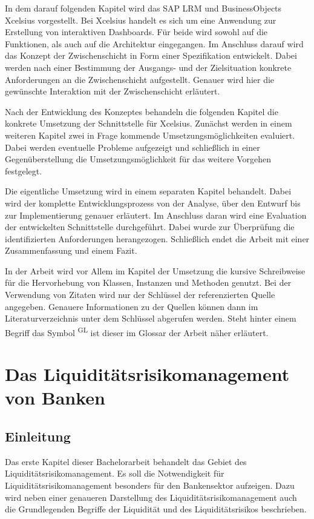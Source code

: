 \begin{onehalfspacing}
In dem darauf folgenden Kapitel wird das SAP LRM und BusinessObjects Xcelsius vorgestellt. Bei Xcelsius handelt es sich um eine Anwendung zur Erstellung von interaktiven Dashboards. Für beide wird sowohl auf die Funktionen, als auch auf die Architektur eingegangen.
Im Anschluss darauf wird das Konzept der Zwischenschicht in Form einer Spezifikation entwickelt. Dabei werden nach einer Bestimmung der Ausgangs- und der Zielsituation konkrete Anforderungen an die Zwischenschicht aufgestellt. Genauer wird hier die gewünschte Interaktion mit der Zwischenschicht erläutert.

Nach der Entwicklung des Konzeptes behandeln die folgenden Kapitel die konkrete Umsetzung der Schnittstelle für Xcelsius. Zunächst werden in einem weiteren Kapitel zwei in Frage kommende Umsetzungsmöglichkeiten evaluiert. Dabei werden eventuelle Probleme aufgezeigt und schließlich in einer Gegenüberstellung die Umsetzungsmöglichkeit für das weitere Vorgehen festgelegt.

Die eigentliche Umsetzung wird in einem separaten Kapitel behandelt. Dabei wird der komplette Entwicklungsprozess von der Analyse, über den Entwurf bis zur Implementierung genauer erläutert.
Im Anschluss daran wird eine Evaluation der entwickelten Schnittstelle durchgeführt. Dabei wurde zur Überprüfung die identifizierten Anforderungen herangezogen. Schließlich endet die Arbeit mit einer Zusammenfassung und einem Fazit.

In der Arbeit wird vor Allem im Kapitel der Umsetzung die kursive Schreibweise für die Hervorhebung von Klassen, Instanzen und Methoden genutzt. Bei der Verwendung von Zitaten wird nur der Schlüssel der referenzierten Quelle angegeben. Genauere Informationen zu der Quellen können dann im Literaturverzeichnis unter dem Schlüssel abgerufen werden. Steht hinter einem Begriff das Symbol \textsuperscript{GL} ist dieser im Glossar der Arbeit näher erläutert.

\chapter{Das Liquiditätsrisikomanagement von Banken}

\section{Einleitung}
Das erste Kapitel dieser Bachelorarbeit behandelt das Gebiet des Liquiditätsrisikomanagement. Es soll die Notwendigkeit für Liquiditätsrisikomanagement besonders für den Bankensektor aufzeigen. Dazu wird neben einer genaueren Darstellung des Liquiditätsrisikomanagement auch die Grundlegenden Begriffe der Liquidität und des Liquiditätsrisikos beschrieben.


\end{onehalfspacing}
